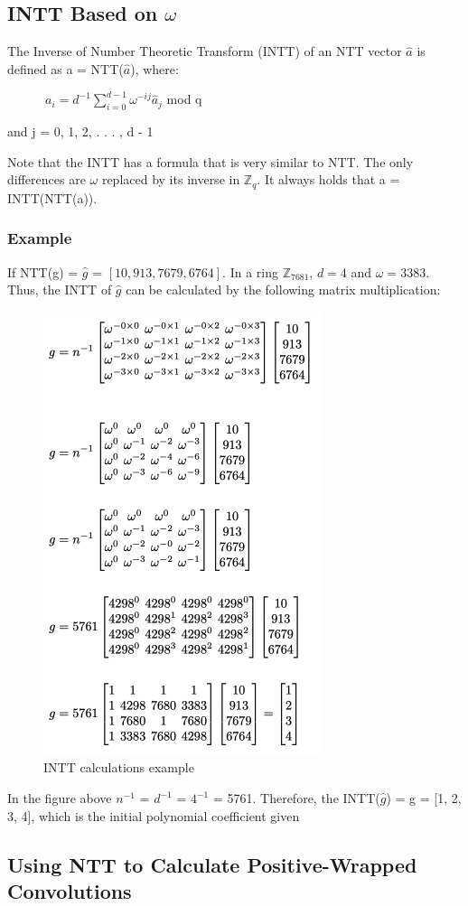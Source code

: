 \documentclass{techrep}
\theoremstyle{definition}
\theoremstyle{plain}
\newcommand{\Z}{\mathbb{Z}}
\begin{document}
	\subsection{INTT Based on $\omega$}
	The Inverse of Number Theoretic Transform (INTT) of an NTT vector $\hat{a}$ is defined as a = NTT($\hat{a}$), where:

	$\quad \quad \quad a_i = d^{-1}\sum_{i=0}^{d - 1}\omega^{-ij}\hat{a}_j$ mod q

	and j = 0, 1, 2, . . . , d - 1

	Note that the INTT has a formula that is very similar to NTT. The only differences are $\omega$ replaced by its inverse in $\Z_{q}$. It always holds that a = INTT(NTT(a)).

	\subsubsection{Example}

	If NTT(g) = $\hat{g}$ = $[10, 913, 7679, 6764]$. In a ring $\Z_{7681}$, $d = 4$ and $\omega =3383$. Thus, the INTT of $\hat{g}$ can be calculated by the following matrix multiplication:


	\begin{figure}[H]
		\centering
		\includegraphics[width=.4\columnwidth]{fig/INTT_cal.png}
		\caption{INTT calculations example}
		\label{fig:INTT_cal}
	\end{figure}

	In the figure above $n^{-1}$ = $d^{-1}$ = $4^{-1}$ = 5761. Therefore, the INTT($\hat{g}$) = g = [1, 2, 3, 4], which is the initial polynomial coefficient given

	\subsection{Using NTT to Calculate Positive-Wrapped Convolutions}
\end{document}
